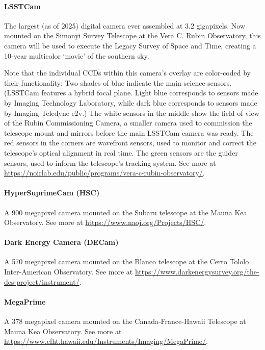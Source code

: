 \paragraph{LSSTCam}

The largest (as of 2025) digital camera ever assembled at 3.2 gigapixels.
Now mounted on the Simonyi Survey Telescope at the Vera C. Rubin Observatory, this camera will be used to execute the Legacy Survey of Space and Time, creating a 10-year multicolor `movie' of the southern sky.

Note that the individual CCDs within this camera's overlay are color-coded by their functionality:
Two shades of blue indicate the main science sensors.
(LSSTCam features a hybrid focal plane.
Light blue corresponds to sensors made by Imaging Technology Laboratory, while dark blue corresponds to sensors made by Imaging Teledyne e2v.)
The white sensors in the middle show the field-of-view of the Rubin Commissioning Camera, a smaller camera used to commission the telescope mount and mirrors before the main LSSTCam camera was ready.
The red sensors in the corners are wavefront sensors, used to monitor and correct the telescope's optical alignment in real time.
The green sensors are the guider sensors, used to inform the telescope's tracking system.
See more at \url{https://noirlab.edu/public/programs/vera-c-rubin-observatory/}.

\paragraph{HyperSuprimeCam (HSC)}

A 900 megapixel camera mounted on the Subaru telescope at the Mauna Kea Observatory.
See more at \url{https://www.naoj.org/Projects/HSC/}.

\paragraph{Dark Energy Camera (DECam)}

A 570 megapixel camera mounted on the Blanco telescope at the Cerro Tololo Inter-American Observatory.
See more at \url{https://www.darkenergysurvey.org/the-des-project/instrument/}.

\paragraph{MegaPrime}

A 378 megapixel camera mounted on the Canada-France-Hawaii Telescope at Mauna Kea Observatory.
See more at \url{https://www.cfht.hawaii.edu/Instruments/Imaging/MegaPrime/}.

